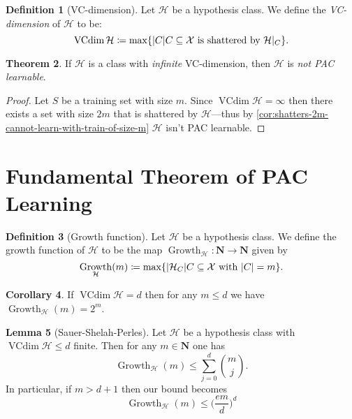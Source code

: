 \documentclass[11pt, reqno]{amsart}
\theoremstyle{definition}
\newtheorem{theorem}{Theorem}[section]
\newtheorem{lemma}[theorem]{Lemma}
\newtheorem{corollary}[theorem]{Corollary}
\newtheorem{definition}[theorem]{Definition}
\renewcommand{\leq}{\leqslant}
\let\colon\relax
\newcommand{\N}{\mathbf{N}}
\DeclareMathOperator{\vcdim}{VCdim}
\DeclareMathOperator{\Growth}{Growth} %
\begin{document}
\begin{definition}[VC-dimension]
\label{def:vc-dimension}
Let \(\mathcal{H}\) be a hypothesis class. We define the \emph{VC-dimension} of
\(\mathcal{H}\) to be:
\[
\vcdim \mathcal{H} \coloneq \max \{|C| \colon C \subseteq \mathcal{X} \text{ is shattered by } \mathcal{H}|_C\}.
\]
\end{definition}

\begin{theorem}
\label{thm:infinite-VC-dim-not-learnable}
If \(\mathcal{H}\) is a class with \emph{infinite} VC-dimension, then
\(\mathcal{H}\) is \emph{not PAC learnable}.
\end{theorem}

\begin{proof}
Let \(S\) be a training set with size \(m\). Since
\(\vcdim \mathcal{H} = \infty\) then there exists a set with size \(2 m\) that is shattered by
\(\mathcal{H}\)---thus by \cref{cor:shatters-2m-cannot-learn-with-train-of-size-m}
\(\mathcal{H}\) isn't PAC learnable.
\end{proof}

\section{Fundamental Theorem of PAC Learning}

\begin{definition}[Growth function]
\label{def:growth-function-learning}
Let \(\mathcal{H}\) be a hypothesis class. We define the growth function of \(\mathcal{H}\) to be
the map \(\Growth_{\mathcal{H}}: \N \to \N\) given by
\[
\Growth_{\mathcal{H}}(m) \coloneq \max \{|\mathcal{H}_C| \colon C \subseteq \mathcal{X} \text{ with } |C| = m\}.
\]
\end{definition}

\begin{corollary}
\label{cor:growth-function-lower-vc-dim}
If \(\vcdim \mathcal{H} = d\) then for any \(m \leq d\) we have \(\Growth_{\mathcal{H}}(m) = 2^m\).
\end{corollary}

\begin{lemma}[Sauer-Shelah-Perles]
\label{lem:sauer-shelah-perles}
Let \(\mathcal{H}\) be a hypothesis class with \(\vcdim \mathcal{H} \leq d\) finite. Then for any
\(m \in \N\) one has
\[
\Growth_{\mathcal{H}}(m) \leq \sum_{j=0}^d \binom m j.
\]
In particular, if \(m > d + 1\) then our bound becomes
\[
\Growth_{\mathcal{H}}(m) \leq \Big(\frac{e m}{d}\Big)^d
\]
\end{lemma}
\end{document}
